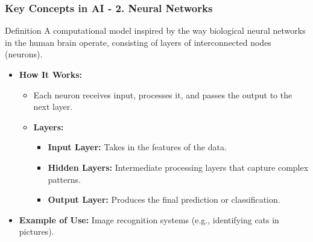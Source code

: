 \documentclass[aspectratio=169]{beamer}
\begin{document}
\begin{frame}[fragile]
    \frametitle{Key Concepts in AI - 2. Neural Networks}
    \begin{block}{Definition}
        A computational model inspired by the way biological neural networks in the human brain operate, consisting of layers of interconnected nodes (neurons).
    \end{block}

    \begin{itemize}
        \item \textbf{How It Works:}
        \begin{itemize}
            \item Each neuron receives input, processes it, and passes the output to the next layer.
            \item \textbf{Layers:}
            \begin{itemize}
                \item \textbf{Input Layer:} Takes in the features of the data.
                \item \textbf{Hidden Layers:} Intermediate processing layers that capture complex patterns.
                \item \textbf{Output Layer:} Produces the final prediction or classification.
            \end{itemize}
        \end{itemize}
        
        \item \textbf{Example of Use:} Image recognition systems (e.g., identifying cats in pictures).
    \end{itemize}
\end{frame}
\end{document}
